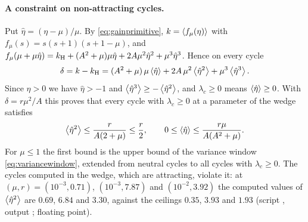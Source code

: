 \paragraph{A constraint on non-attracting cycles.}
Put $\hat\eta=(\eta-\mu)/\mu$. By \eqref{eq:gainprimitive}, $k=\left\langle f_\mu(\eta)\right\rangle$ with $f_\mu(s)=s(s+1)(s+1-\mu)$, and $f_\mu(\mu+\mu\hat\eta)=k_{\mathrm H}+(A^2+\mu)\mu\hat\eta+2A\mu^2\hat\eta^2+\mu^3\hat\eta^3$. Hence on every cycle
\begin{equation}\label{wed:eq:moment}
\delta=k-k_{\mathrm H}=(A^2+\mu)\,\mu\left\langle \hat\eta\right\rangle+2A\,\mu^2\left\langle \hat\eta^2\right\rangle+\mu^3\left\langle \hat\eta^3\right\rangle.
\end{equation}
Since $\eta>0$ we have $\hat\eta>-1$ and $\left\langle \hat\eta^3\right\rangle\ge-\left\langle \hat\eta^2\right\rangle$, and $\lambda_c\ge0$ means $\left\langle \hat\eta\right\rangle\ge0$. With $\delta=r\mu^2/A$ this proves that every cycle with $\lambda_c\ge0$ at a parameter of the wedge satisfies
\begin{equation}\label{wed:eq:ceiling}
\left\langle \hat\eta^2\right\rangle\le\frac{r}{A(2+\mu)}\le\frac r2,\qquad 0\le\left\langle \hat\eta\right\rangle\le\frac{r\mu}{A(A^2+\mu)} .
\end{equation}
For $\mu\le1$ the first bound is the upper bound of the variance window \eqref{eq:variancewindow}, extended from neutral cycles to all cycles with $\lambda_c\ge0$. The cycles computed in the wedge, which are attracting, violate it: at $(\mu,r)=(10^{-3},0.71)$, $(10^{-3},7.87)$ and $(10^{-2},3.92)$ the computed values of $\left\langle \hat\eta^2\right\rangle$ are $0.69$, $6.84$ and $3.30$, against the ceilings $0.35$, $3.93$ and $1.93$ (script , output ; floating point).

